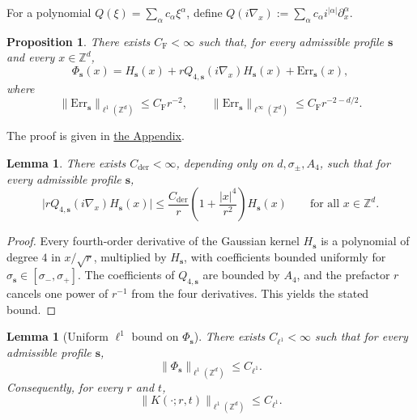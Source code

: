 \documentclass[letterpaper,11pt,reqno]{amsart}
\newtheorem{lemma}[thm]{Lemma}
\newtheorem{prop}[thm]{Proposition}
\theoremstyle{definition}
\newcommand{\abs}[1]{\left\vert#1\right\vert}
\newcommand{\vs}{\mathbf{s}}\newcommand{\vt}{\mathbf{t}}\newcommand{\vu}{\mathbf{u}}
\begin{document}
For a polynomial $Q(\xi)=\sum_\alpha c_\alpha \xi^\alpha$, define $Q(i\nabla_x):=\sum_\alpha c_\alpha i^{\abs{\alpha}}\partial_x^\alpha$.

\begin{prop}\label{prop:Fourier-six-exp}
There exists \(C_{\mathrm F}<\infty\) such that, for every admissible profile \(\vs\) and every \(x\in\mathbb Z^d\),
\begin{equation}\label{eq:main-expansion}
\Phi_\vs(x)
=
H_\vs(x)
+
rQ_{4,\vs}(i\nabla_x)H_\vs(x)
+
\mathrm{Err}_\vs(x),
\end{equation}
where
\begin{equation}\label{eq:ErrBounds}
\|\mathrm{Err}_\vs\|_{\ell^1(\mathbb Z^d)}
\le C_{\mathrm F}r^{-2},
\qquad
\|\mathrm{Err}_\vs\|_{\ell^\infty(\mathbb Z^d)}
\le C_{\mathrm F}r^{-2-d/2}.
\end{equation}
\end{prop}
\noindent
The proof is given in \hyperref[sec:appendix]{the Appendix}.



\begin{lemma}\label{lem:derivative-bound}
There exists \(C_{\mathrm{der}}<\infty\), depending only on \(d,\sigma_\pm,A_4\), such that for every admissible profile \(\mathbf s\),
\[
\big|rQ_{4,\mathbf s}(i\nabla_x)H_{\mathbf s}(x)\big|
\le
\frac{C_{\mathrm{der}}}{r}\left(1+\frac{|x|^4}{r^2}\right)H_{\mathbf s}(x)
\qquad\text{for all }x\in\mathbb Z^d.
\]
\end{lemma}

\begin{proof}
Every fourth-order derivative of the Gaussian kernel \(H_{\mathbf s}\) is a polynomial of degree \(4\) in
\(x/\sqrt r\), multiplied by \(H_{\mathbf s}\), with coefficients bounded uniformly for
\(\sigma_{\mathbf s}\in[\sigma_-,\sigma_+]\). The coefficients of \(Q_{4,\mathbf s}\) are bounded by \(A_4\), and the prefactor \(r\) cancels one power of \(r^{-1}\) from the four derivatives. This yields the stated bound.
\end{proof}

\begin{lemma}[Uniform \(\ell^1\) bound on \(\Phi_{\mathbf s}\)]\label{lem:Phi-l1}
There exists \(C_{\ell^1}<\infty\) such that for every admissible profile \(\mathbf s\),
\[
\|\Phi_{\mathbf s}\|_{\ell^1(\mathbb Z^d)}\le C_{\ell^1}.
\]
Consequently, for every \(r\) and \(t\),
\[
\|K(\cdot;r,t)\|_{\ell^1(\mathbb Z^d)}\le C_{\ell^1}.
\]
\end{lemma}
\end{document}
